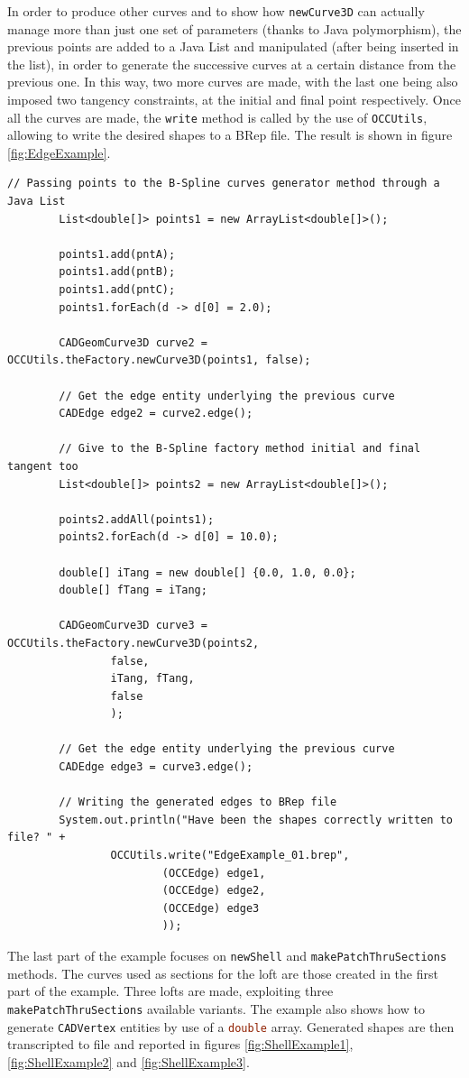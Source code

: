 In order to produce other curves and to show how \lstinline[language=Java]!newCurve3D! can actually manage more than just one set of parameters (thanks to Java polymorphism), the previous points are added to a Java \gls{List} \cite{JavaList} and manipulated (after being inserted in the list), in order to generate the successive curves at a certain distance from the previous one. In this way, two more curves are made, with the last one being also imposed two tangency constraints, at the initial and final point respectively. Once all the curves are made, the \lstinline[language=Java]!write! method is called by the use of \lstinline[language=Java]!OCCUtils!, allowing to write the desired shapes to a BRep file. The result is shown in figure \ref{fig:EdgeExample}.
%
\bigskip
\begin{lstlisting}[caption={B-Spline curve creation with different \lstinline!newCurve3D! methods}, captionpos=b, tabsize=2, label={lst:Example2}]		
		// Passing points to the B-Spline curves generator method through a Java List
		List<double[]> points1 = new ArrayList<double[]>();
		
		points1.add(pntA);
		points1.add(pntB);
		points1.add(pntC);		
		points1.forEach(d -> d[0] = 2.0);
		
		CADGeomCurve3D curve2 = OCCUtils.theFactory.newCurve3D(points1, false);
		
		// Get the edge entity underlying the previous curve
		CADEdge edge2 = curve2.edge();
		
		// Give to the B-Spline factory method initial and final tangent too
		List<double[]> points2 = new ArrayList<double[]>();
		
		points2.addAll(points1);
		points2.forEach(d -> d[0] = 10.0);
		
		double[] iTang = new double[] {0.0, 1.0, 0.0};
		double[] fTang = iTang;
		
		CADGeomCurve3D curve3 = OCCUtils.theFactory.newCurve3D(points2, 
				false, 
				iTang, fTang, 
				false
				);
		
		// Get the edge entity underlying the previous curve
		CADEdge edge3 = curve3.edge();
		
		// Writing the generated edges to BRep file
		System.out.println("Have been the shapes correctly written to file? " + 
				OCCUtils.write("EdgeExample_01.brep", 
						(OCCEdge) edge1, 
						(OCCEdge) edge2,
						(OCCEdge) edge3
						));
\end{lstlisting}
%
\bigskip
\noindent
The last part of the example focuses on \lstinline[language=Java]!newShell! and \lstinline[language=Java]!makePatchThruSections! methods. The curves used as sections for the loft are those created in the first part of the example. Three lofts are made, exploiting three \lstinline[language=Java]!makePatchThruSections! available variants. The example also shows how to generate \lstinline[language=Java]!CADVertex! entities by use of a \lstinline[language=Java]!double! array. Generated shapes are then transcripted to file and reported in figures \ref{fig:ShellExample1}, \ref{fig:ShellExample2} and \ref{fig:ShellExample3}.
